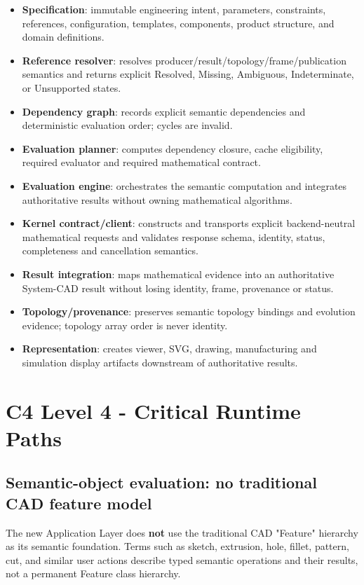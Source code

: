 \documentclass[11pt,a4paper]{report}
\begin{document}
\begin{itemize}
\item \textbf{Specification}: immutable engineering intent, parameters, constraints, references, configuration, templates, components, product structure, and domain definitions.
\item \textbf{Reference resolver}: resolves producer/result/topology/frame/publication semantics and returns explicit Resolved, Missing, Ambiguous, Indeterminate, or Unsupported states.
\item \textbf{Dependency graph}: records explicit semantic dependencies and deterministic evaluation order; cycles are invalid.
\item \textbf{Evaluation planner}: computes dependency closure, cache eligibility, required evaluator and required mathematical contract.
\item \textbf{Evaluation engine}: orchestrates the semantic computation and integrates authoritative results without owning mathematical algorithms.
\item \textbf{Kernel contract/client}: constructs and transports explicit backend-neutral mathematical requests and validates response schema, identity, status, completeness and cancellation semantics.
\item \textbf{Result integration}: maps mathematical evidence into an authoritative System-CAD result without losing identity, frame, provenance or status.
\item \textbf{Topology/provenance}: preserves semantic topology bindings and evolution evidence; topology array order is never identity.
\item \textbf{Representation}: creates viewer, SVG, drawing, manufacturing and simulation display artifacts downstream of authoritative results.
\end{itemize}

\chapter{C4 Level 4 - Critical Runtime Paths}

\section{Semantic-object evaluation: no traditional CAD feature model}

The new Application Layer does \textbf{not} use the traditional CAD "Feature" hierarchy as its semantic foundation. Terms such as sketch, extrusion, hole, fillet, pattern, cut, and similar user actions describe typed semantic operations and their results, not a permanent Feature class hierarchy.
\end{document}
